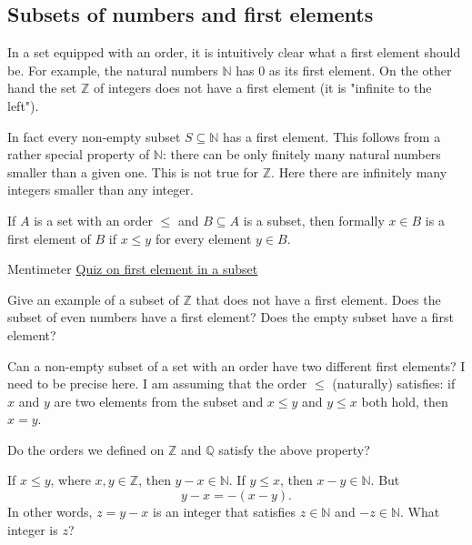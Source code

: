 \subsection{Subsets of numbers and first elements}\label{subsecfirst}

In a set equipped with an order, it is intuitively clear what a first element should be. For example,
the natural numbers $\mathbb{N}$ has $0$ as its first element. On the other hand the set $\mathbb{Z}$ of
integers does not have a first element (it is "infinite to the left").

In fact every non-empty subset $S\subseteq \mathbb{N}$ has
a first element. This follows from a rather special property of $\mathbb{N}$: there
can be only finitely many natural numbers smaller than a given one. This is
not true for $\mathbb{Z}$. Here there are infinitely many integers smaller than
any integer.

\begin{tcolorbox}
  If $A$ is a set with an order $\leq$ and $B\subseteq A$ is a subset, then formally $x\in B$ is a
  first element of $B$ if $x \leq y$ for every element $y\in B$.
\end{tcolorbox}

\begin{button}{Mentimeter}
  \href{https://www.mentimeter.com/s/944f0773c724bda382e7f1d86acb3099/05a2213888c9}{Quiz on first element in a subset}
\end{button}

\begin{exercise}
  Give an example of a subset of $\mathbb{Z}$ that does not have a first element. Does the
  subset of even numbers have a first element? Does the empty subset have a first element?
\end{exercise}

\begin{exercise}
  Can a non-empty subset of a set with an order have two different first elements? I need to
  be precise here. I am assuming that the order $\leq$ (naturally) satisfies: if
  $x$ and $y$ are two elements from the subset and $x\leq y$ and $y \leq x$ both hold,
  then $x = y$.

  Do the orders we defined on $\mathbb{Z}$ and $\mathbb{Q}$ satisfy the above property?

  \begin{hint}
    If $x \leq y$, where $x, y\in \mathbb{Z}$, then $y - x\in \mathbb{N}$. If $y \leq x$, then $x - y\in \mathbb{N}$.
    But
    $$
      y - x = - (x - y).
    $$
    In other words, $z = y - x$ is an integer that satisfies $z\in \mathbb{N}$ and $-z\in \mathbb{N}$.
    What integer is $z$?
  \end{hint}
\end{exercise}

